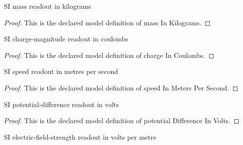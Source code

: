 \begin{definition}
  \label{def:physics:phyx-mini-0640:phyxminiproblems-problemphyxmini0640-massinkilograms}
  SI mass readout in kilograms
\end{definition}
\begin{proof}
  This is the declared model definition of mass In Kilograms.
\end{proof}
\begin{definition}
  \label{def:physics:phyx-mini-0640:phyxminiproblems-problemphyxmini0640-chargeincoulombs}
  SI charge-magnitude readout in coulombs
\end{definition}
\begin{proof}
  This is the declared model definition of charge In Coulombs.
\end{proof}
\begin{definition}
  \label{def:physics:phyx-mini-0640:phyxminiproblems-problemphyxmini0640-speedinmeterspersecond}
  SI speed readout in metres per second
\end{definition}
\begin{proof}
  This is the declared model definition of speed In Meters Per Second.
\end{proof}
\begin{definition}
  \label{def:physics:phyx-mini-0640:phyxminiproblems-problemphyxmini0640-potentialdifferenceinvolts}
  SI potential-difference readout in volts
\end{definition}
\begin{proof}
  This is the declared model definition of potential Difference In Volts.
\end{proof}
\begin{definition}
  \label{def:physics:phyx-mini-0640:phyxminiproblems-problemphyxmini0640-electricfieldstrengthinvoltspermeter}
  SI electric-field-strength readout in volts per metre
\end{definition}
